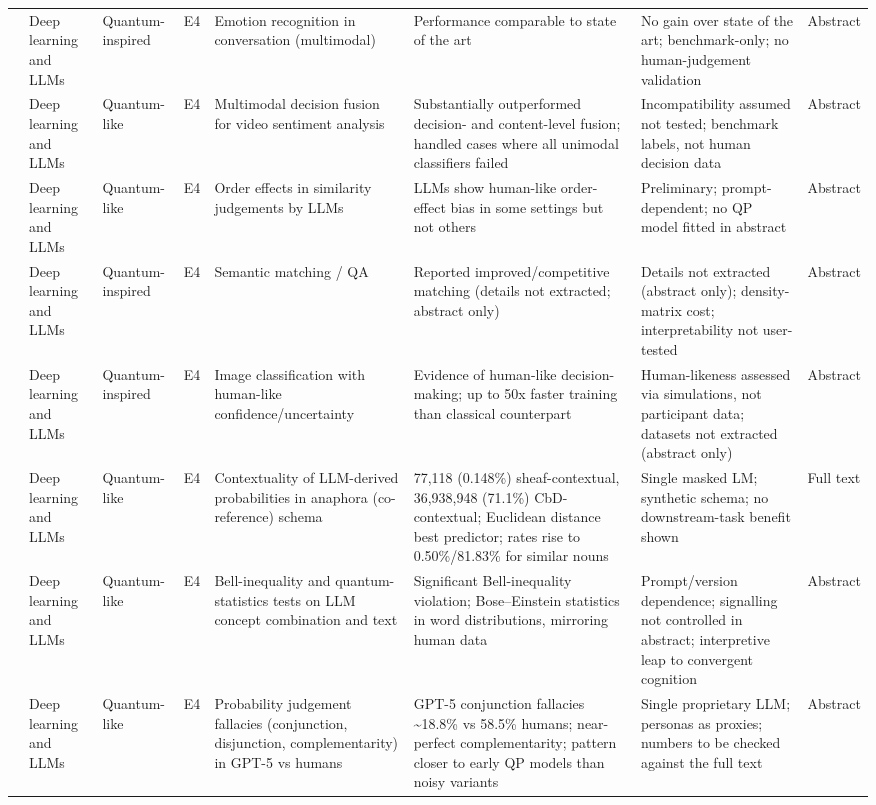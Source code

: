 \documentclass[10pt,a4paper]{article}
\begin{document}
\begin{landscape}
\begin{longtable}{@{}P{3.0cm}P{2.2cm}P{2.1cm}P{0.6cm}P{4.2cm}P{4.6cm}P{4.4cm}P{1.0cm}@{}}
\citet{Li2021b} & Deep learning and LLMs & Quantum-inspired & E4 & Emotion recognition in conversation (multimodal) & Performance comparable to state of the art & No gain over state of the art; benchmark-only; no human-judgement validation & Abstract \\
\citet{Gkoumas2021} & Deep learning and LLMs & Quantum-like & E4 & Multimodal decision fusion for video sentiment analysis & Substantially outperformed decision- and content-level fusion; handled cases where all unimodal classifiers failed & Incompatibility assumed not tested; benchmark labels, not human decision data & Abstract \\
\citet{Uprety2024} & Deep learning and LLMs & Quantum-like & E4 & Order effects in similarity judgements by LLMs & LLMs show human-like order-effect bias in some settings but not others & Preliminary; prompt-dependent; no QP model fitted in abstract & Abstract \\
\citet{Zhang2025} & Deep learning and LLMs & Quantum-inspired & E4 & Semantic matching / QA & Reported improved/competitive matching (details not extracted; abstract only) & Details not extracted (abstract only); density-matrix cost; interpretability not user-tested & Abstract \\
\citet{Maksimovic2025} & Deep learning and LLMs & Quantum-inspired & E4 & Image classification with human-like confidence/uncertainty & Evidence of human-like decision-making; up to 50x faster training than classical counterpart & Human-likeness assessed via simulations, not participant data; datasets not extracted (abstract only) & Abstract \\
\citet{Lo2025} & Deep learning and LLMs & Quantum-like & E4 & Contextuality of LLM-derived probabilities in anaphora (co-reference) schema & 77,118 (0.148\%) sheaf-contextual, 36,938,948 (71.1\%) CbD-contextual; Euclidean distance best predictor; rates rise to 0.50\%/81.83\% for similar nouns & Single masked LM; synthetic schema; no downstream-task benefit shown & Full text \\
\citet{Aerts2026} & Deep learning and LLMs & Quantum-like & E4 & Bell-inequality and quantum-statistics tests on LLM concept combination and text & Significant Bell-inequality violation; Bose--Einstein statistics in word distributions, mirroring human data & Prompt/version dependence; signalling not controlled in abstract; interpretive leap to convergent cognition & Abstract \\
\citet{Imannezhad2026} & Deep learning and LLMs & Quantum-like & E4 & Probability judgement fallacies (conjunction, disjunction, complementarity) in GPT-5 vs humans & GPT-5 conjunction fallacies \textasciitilde{}18.8\% vs 58.5\% humans; near-perfect complementarity; pattern closer to early QP models than noisy variants & Single proprietary LLM; personas as proxies; numbers to be checked against the full text & Abstract \\

\end{longtable}
\end{landscape}
\end{document}
